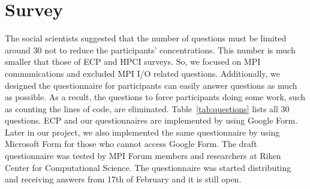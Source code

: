 \documentclass[conference,10pt,letterpaper]{IEEEtran}
\begin{document}
\section{Survey}
%
%
The social scientists suggested that the number of questions must be
limited around 30 not to reduce the participants' concentrations.  
This number is much smaller that those of ECP and HPCI surveys. So, we
focused on MPI communications and excluded MPI I/O related
questions. Additionally, we designed the questionnaire for
participants can easily answer questions as much as possible. As a
result, the questions to force participants doing some work, such as
counting the lines of code, are eliminated. Table~\ref{tab:questions}
lists all 30 questions.
%
ECP and our questionnaires are implemented by using Google Form. Later
in our project, we also implemented the same questionnaire by using
Microsoft Form for those who cannot access Google Form.
%
The draft questionnaire was tested by MPI Forum members and
researchers at Riken Center for Computational Science. 
The questionnaire was started distributing and receiving answers from
17th of February and it is still open.
%
\end{document}

